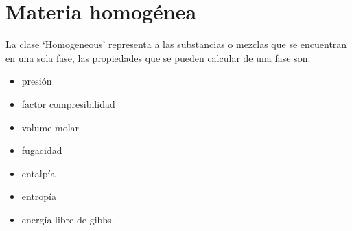 \section{Materia homogénea}\label{sec:homogeneous}

	La clase `Homogeneous' representa a las substancias o mezclas que se encuentran en una sola fase, las propiedades que se pueden calcular de una fase son: 
\begin{itemize}
	\item presión
	\item factor compresibilidad 
	\item volume molar
	\item fugacidad	
	\item entalpía 
	\item entropía 
	\item energía libre de gibbs.
\end{itemize}
